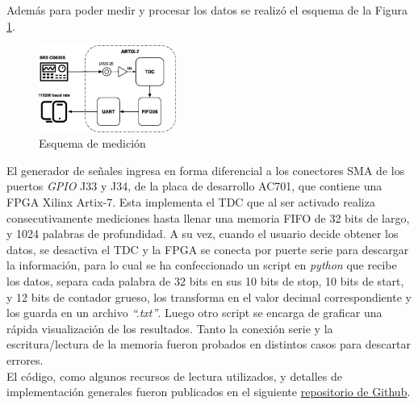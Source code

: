 Además para poder medir y procesar los datos se realizó el esquema de la Figura \ref{fig: esquema}.
\begin{figure}[H]
      \centering
      \includegraphics[width=0.4\textwidth]{imagenes/TDC-functional-blocks.eps}
      \caption{Esquema de medición}
      \label{fig: esquema}
\end{figure}
El generador de señales ingresa en forma diferencial a los conectores SMA de los puertos \textit{GPIO} J33 y J34, de la
placa de desarrollo AC701, que contiene una FPGA Xilinx Artix-7. Esta implementa el TDC que al ser activado
realiza consecutivamente mediciones hasta llenar una memoria FIFO de 32 bits de largo, y 1024 palabras de profundidad.
A su vez, cuando el usuario decide obtener los datos, se desactiva el TDC y la FPGA se conecta por puerte serie 
para descargar la información, para lo cual se ha confeccionado un script en \textit{python} que recibe los datos,
separa cada palabra de 32 bits en sus 10 bits de stop, 10 bits de start, y 12 bits de contador grueso, los
transforma en el valor decimal correspondiente y los guarda en un archivo \textit{``.txt''}. Luego otro script se encarga
de graficar una rápida visualización de los resultados. Tanto la conexión serie y la escritura/lectura de la memoria fueron
probados en distintos casos para descartar errores.\\

El código, como algunos recursos de lectura utilizados, y detalles de implementación generales fueron publicados en el
siguiente \href{https://github.com/Miquefil/TDC-in-Artix-7}{repositorio de Github}.


\clearpage
